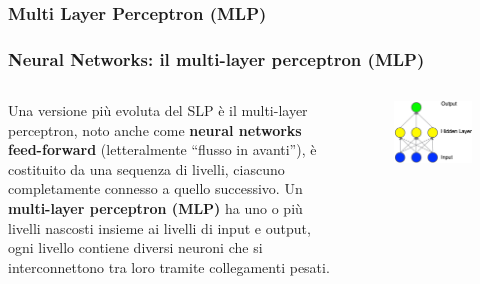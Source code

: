 \subsubsection[Multi Layer Perceptron (MLP)]{Multi Layer Perceptron (MLP)}
\begin{frame}

	\frametitle{Neural Networks: il multi-layer perceptron (MLP)}

	\begin{columns}
		Una versione più evoluta del SLP è il multi-layer perceptron, noto anche come \textbf{neural networks feed-forward} (letteralmente ``flusso in avanti''), è costituito da una sequenza di livelli, ciascuno completamente connesso a quello successivo.
		\newlinedouble
		Un \textbf{multi-layer perceptron (MLP)} ha uno o più livelli nascosti insieme ai livelli di input e output, ogni livello contiene diversi neuroni che si interconnettono tra loro tramite collegamenti pesati.

		\begin{figure}[!htbp]
			\centering
			\includegraphics[width=1.0\linewidth]{images/supervised/z_algorithms_neural_networks/1hidden.png}
		\end{figure}
	\end{columns}
\end{frame}


